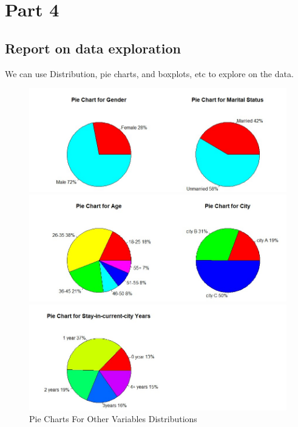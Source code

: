 \documentclass[12pt]{article}
\begin{document}
\section{Part 4}
\subsection{Report on  data exploration}
We can use Distribution, pie charts, and boxplots, etc to explore on the data.
\begin{figure}[H]
	\centering
	\includegraphics[width=1\textwidth]{Rplot04.jpg}

	\centering
	\includegraphics[width=1\textwidth]{Rplot05.jpg}

	\centering
	\includegraphics[width=1\textwidth]{Rplot06.jpg}
	\caption{Pie Charts For Other Variables Distributions}
\end{figure}
\end{document}
